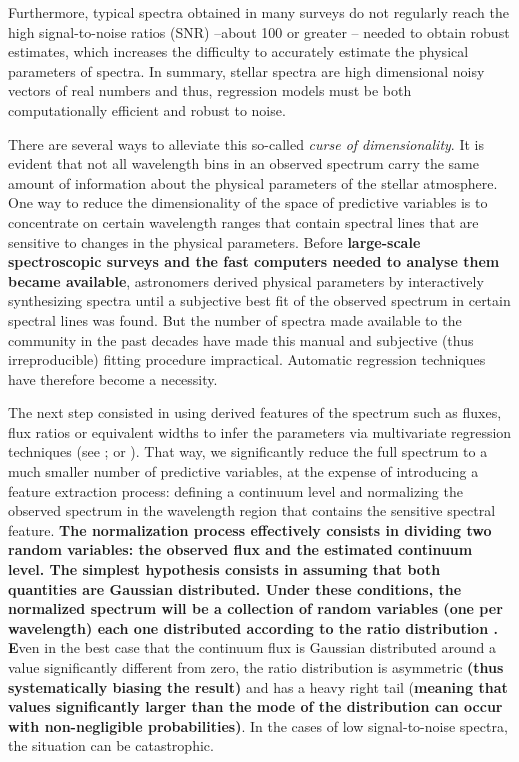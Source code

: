 \documentclass[a4paper,fleqn,usenatbib]{mnras}
\begin{document}
Furthermore, typical spectra obtained in many surveys do not 
regularly reach the high signal-to-noise ratios (SNR) --about
100 or greater -- needed to obtain robust estimates, which
increases the difficulty to accurately estimate the physical
parameters of spectra.  In summary, stellar spectra are high
dimensional noisy vectors of real numbers and thus,
regression models must be both computationally efficient and robust
to noise.

There are several ways to alleviate this so-called \textit{curse of
  dimensionality}. It is evident that not all wavelength bins in an
observed spectrum carry the same amount of information about the
physical parameters of the stellar atmosphere. One way to reduce the
dimensionality of the space of predictive variables is to concentrate
on certain wavelength ranges that contain spectral lines that are
sensitive to changes in the physical parameters. Before {\bf large-scale 
	spectroscopic surveys and the fast computers needed to analyse them 
	became available}, astronomers derived
physical parameters by interactively synthesizing spectra until a
subjective best fit of the observed spectrum in certain spectral lines
was found. But the number of spectra made available to the community
in the past decades have made this manual and subjective (thus
irreproducible) fitting procedure impractical. Automatic regression
techniques have therefore become a necessity.

The next step consisted in using derived features of the spectrum such
as fluxes, flux ratios or equivalent widths to infer the parameters
via multivariate regression techniques (see \citealt{2006ApJ...636..804A,
2010ApJ...720L.113R,2012ApJ...748...93R,2010MNRAS.405.1907B}; or \citealt{2006A&A...456.1109M}). 
That way, we significantly reduce the
full spectrum to a much smaller number of predictive variables, at
the expense of introducing a feature extraction process: defining a
continuum level and normalizing the observed spectrum in the
wavelength region that contains the sensitive spectral feature. 
{\bf The normalization process effectively consists in dividing two 
	random variables: the observed flux and the estimated continuum 
	level. The simplest hypothesis consists in assuming that both 
	quantities are Gaussian distributed. Under these conditions, the normalized 
	spectrum will be a collection of random variables (one per 
	wavelength) each one distributed according to the ratio 
	distribution \citep[see e.g.][]{10.2307/2342070, 
		doi:10.1080/01621459.1965.10480783}. E}ven in the best case 
that the continuum flux is Gaussian distributed around a value significantly
different from zero, the ratio distribution is asymmetric {\bf (thus 
systematically biasing the result)} and has a heavy right tail 
{(\bf meaning that values significantly larger than the mode of the 
	distribution can occur with non-negligible probabilities)}. In the 
cases of low signal-to-noise spectra, the situation can be catastrophic.
\end{document}
